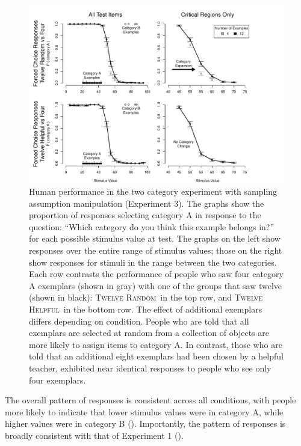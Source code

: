 \documentclass[doc,apacite]{apa6}
\newcommand{\random}{\textsc{Twelve Random}}
\newcommand{\helpful}{\textsc{Twelve Helpful}}
\begin{document}
\begin{figure}[htbp]
\includegraphics[width=1.0\textwidth]{figures/two_cat_sampling_results.pdf}
\vspace{-1mm}
\caption{%
Human performance in the two category experiment with sampling assumption 
manipulation (Experiment 3). 
%
The graphs show the proportion of responses 
selecting category A in response to the question: ``Which category do you think 
this example belongs in?'' for each possible stimulus value at test. 
%
The graphs on the left show responses over the entire range of stimulus values;
those on the right show responses for stimuli in the range between the two 
categories. 
%
Each row contrasts the performance of people who saw four category A exemplars
(shown in gray) with one of the groups that saw 
twelve (shown in black): \random\ in the top row, and \helpful\ in the bottom row.
%
The effect of additional exemplars differs depending on
condition. People who are told that all exemplars are
selected at random from a collection of objects are more likely to assign items to
category A. In contrast, those who are told that an additional eight exemplars had been chosen by a
helpful teacher, exhibited near identical responses to people who see only four
exemplars.
}
\label{fig:exp3-results}
\end{figure}

The overall pattern of responses is consistent across all conditions, with
people more likely to indicate that lower stimulus values were in category A,
while higher values were in category B (). Importantly, the pattern of responses is broadly consistent with that of Experiment 1 ().
%
\end{document}
